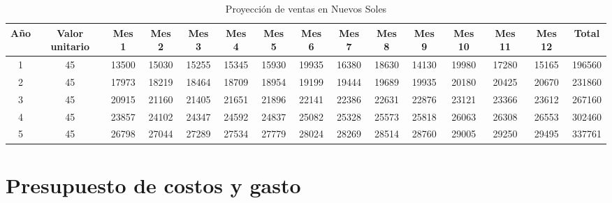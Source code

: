 \documentclass[a4paper,openright,12pt]{book}
\begin{document}
\begin{table}[H]
\centering
\resizebox{18cm}{!} {
\begin{tabular}{ccccccccccccccc}
\hline
\textbf{Año} & \textbf{Valor unitario} & \textbf{Mes 1} & \textbf{Mes 2} & \textbf{Mes 3} & \textbf{Mes 4} & \textbf{Mes 5} & \textbf{Mes 6} & \textbf{Mes 7} & \textbf{Mes 8} & \textbf{Mes 9} & \textbf{Mes 10} & \textbf{Mes 11} & \textbf{Mes 12} & \textbf{Total} \\ \hline
1            & 45                      & 13500          & 15030          & 15255          & 15345          & 15930          & 19935          & 16380          & 18630          & 14130          & 19980           & 17280           & 15165           & 196560         \\
2            & 45                      & 17973          & 18219          & 18464          & 18709          & 18954          & 19199          & 19444          & 19689          & 19935          & 20180           & 20425           & 20670           & 231860         \\
3            & 45                      & 20915          & 21160          & 21405          & 21651          & 21896          & 22141          & 22386          & 22631          & 22876          & 23121           & 23366           & 23612           & 267160         \\
4            & 45                      & 23857          & 24102          & 24347          & 24592          & 24837          & 25082          & 25328          & 25573          & 25818          & 26063           & 26308           & 26553           & 302460         \\
5            & 45                      & 26798          & 27044          & 27289          & 27534          & 27779          & 28024          & 28269          & 28514          & 28760          & 29005           & 29250           & 29495           & 337761         \\ \hline
\end{tabular}
}
\caption{Proyección de ventas en Nuevos Soles}
\label{Tabla7}
\end{table}

\section{Presupuesto de costos y gasto}
\end{document}
